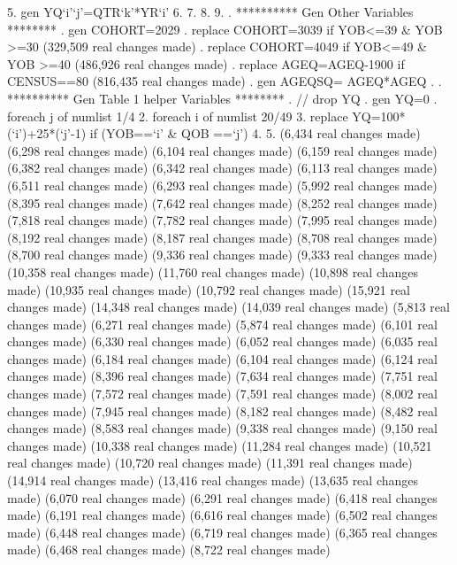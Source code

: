   5.                 gen YQ`i'`j'=QTR`k'*YR`i'
  6.         {\rbr}
  7.         {\rbr}
  8. {\rbr}
  9. {\rbr}
{\smallskip}
. **********  Gen Other Variables ********
. gen COHORT=2029
{\smallskip}
. replace COHORT=3039 if YOB<=39 \& YOB >=30
(329,509 real changes made)
{\smallskip}
. replace COHORT=4049 if YOB<=49 \& YOB >=40
(486,926 real changes made)
{\smallskip}
. replace AGEQ=AGEQ-1900 if CENSUS==80
(816,435 real changes made)
{\smallskip}
. gen AGEQSQ= AGEQ*AGEQ
{\smallskip}
. 
. **********  Gen Table 1 helper Variables ********
. // drop YQ
. gen YQ=0
{\smallskip}
. foreach j of numlist 1/4 {\lbr}
  2. foreach i of numlist 20/49 {\lbr}
  3. replace YQ=100*(`i')+25*(`j'-1) if (YOB==`i' \& QOB ==`j')
  4. {\rbr}
  5. {\rbr}
(6,434 real changes made)
(6,298 real changes made)
(6,104 real changes made)
(6,159 real changes made)
(6,382 real changes made)
(6,342 real changes made)
(6,113 real changes made)
(6,511 real changes made)
(6,293 real changes made)
(5,992 real changes made)
(8,395 real changes made)
(7,642 real changes made)
(8,252 real changes made)
(7,818 real changes made)
(7,782 real changes made)
(7,995 real changes made)
(8,192 real changes made)
(8,187 real changes made)
(8,708 real changes made)
(8,700 real changes made)
(9,336 real changes made)
(9,333 real changes made)
(10,358 real changes made)
(11,760 real changes made)
(10,898 real changes made)
(10,935 real changes made)
(10,792 real changes made)
(15,921 real changes made)
(14,348 real changes made)
(14,039 real changes made)
(5,813 real changes made)
(6,271 real changes made)
(5,874 real changes made)
(6,101 real changes made)
(6,330 real changes made)
(6,052 real changes made)
(6,035 real changes made)
(6,184 real changes made)
(6,104 real changes made)
(6,124 real changes made)
(8,396 real changes made)
(7,634 real changes made)
(7,751 real changes made)
(7,572 real changes made)
(7,591 real changes made)
(8,002 real changes made)
(7,945 real changes made)
(8,182 real changes made)
(8,482 real changes made)
(8,583 real changes made)
(9,338 real changes made)
(9,150 real changes made)
(10,338 real changes made)
(11,284 real changes made)
(10,521 real changes made)
(10,720 real changes made)
(11,391 real changes made)
(14,914 real changes made)
(13,416 real changes made)
(13,635 real changes made)
(6,070 real changes made)
(6,291 real changes made)
(6,418 real changes made)
(6,191 real changes made)
(6,616 real changes made)
(6,502 real changes made)
(6,448 real changes made)
(6,719 real changes made)
(6,365 real changes made)
(6,468 real changes made)
(8,722 real changes made)
